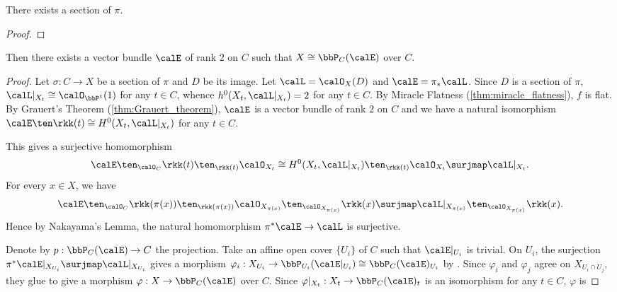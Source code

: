     \begin{lemma}\label{lem:existence_of_section_of_ruled_surface}
        There exists a section of \(\pi\).
    \end{lemma}
    \begin{proof}
    \end{proof}

    \begin{proposition}\label{prop:ruled_surface_as_projective_bundle}
        Then there exists a vector bundle \(\calE\) of rank \(2\) on \(C\) such that \(X \cong \bbP_C(\calE)\) over \(C\).
    \end{proposition}
    \begin{proof}
        Let \(\sigma:C \to X\) be a section of \(\pi\) and \(D\) be its image.
        Let \(\calL = \calO_X(D)\) and \(\calE = \pi_*\calL\).
        Since \(D\) is a section of \(\pi\), \(\calL|_{X_t} \cong \calO_{\bbP^1}(1)\) for any \(t \in C\), whence \(h^0(X_t,\calL|_{X_t}) = 2\) for any \(t \in C\).
        By Miracle Flatness (\cref{thm:miracle_flatness}), \(f\) is flat.
        By Grauert's Theorem (\cref{thm:Grauert_theorem}), \(\calE\) is a vector bundle of rank \(2\) on \(C\) and we have a natural isomorphism \(\calE \ten \rkk(t) \cong H^0(X_t,\calL|_{X_t})\) for any \(t \in C\).

        This gives a surjective homomorphism 
        \[ \calE \ten_{\calO_C} \rkk(t) \ten_{\rkk(t)} \calO_{X_t} \cong H^0(X_t,\calL|_{X_t}) \ten_{\rkk(t)} \calO_{X_t} \surjmap \calL|_{X_t}. \]
        For every \(x \in X\), we have 
        \[ \calE \ten_{\calO_C} \rkk(\pi(x)) \ten_{\rkk(\pi(x))} \calO_{X_{\pi(x)}} \ten_{\calO_{X_{\pi(x)}}} \rkk(x)  \surjmap \calL|_{X_{\pi(x)}}\ten_{\calO_{X_{\pi(x)}}} \rkk(x). \]
        Hence by Nakayama's Lemma, the natural homomorphism \(\pi^*\calE \to \calL\) is surjective.

        Denote by \(p: \bbP_C(\calE) \to C\) the projection.
        Take an affine open cover \(\{U_i\}\) of \(C\) such that \(\calE|_{U_i}\) is trivial.
        On \(U_i\), the surjection \(\pi^*\calE|_{X_{U_i}} \surjmap \calL|_{X_{U_i}}\) gives a morphism \(\varphi_i: X_{U_i} \to \bbP_{U_i}(\calE|_{U_i}) \cong \bbP_{C}(\calE)_{U_i}\) by .
        Since \(\varphi_i\) and \(\varphi_j\) agree on \(X_{U_i \cap U_j}\), they glue to give a morphism \(\varphi:X \to \bbP_C(\calE)\) over \(C\).
        Since \(\varphi|_{X_t}:X_t \to \bbP_C(\calE)_t\) is an isomorphism for any \(t \in C\), \(\varphi\) is 
    \end{proof}

